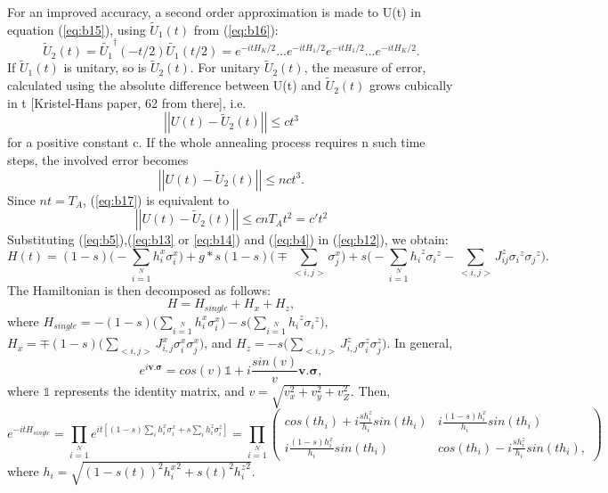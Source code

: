 \documentclass[12]{article}
\begin{document}
For an improved accuracy, a second order approximation is made to U(t) in equation (\ref{eq:b15}), using $\tilde{U}_1(t)$ from (\ref{eq:b16}):
\begin{equation}
\tilde{U}_2(t)=\tilde{U_1}^{\dagger}(-t/2)\tilde{U_1}(t/2)=e^{-itH_K/2}...e^{-itH_1/2}e^{-itH_1/2}...e^{-itH_K/2}.
\end{equation}
If $\tilde{U}_1(t)$ is unitary, so is $\tilde{U}_2(t)$. For unitary $\tilde{U}_2(t)$, the measure of error, calculated using the absolute difference between U(t) and $\tilde{U}_2(t)$ grows cubically in t [Kristel-Hans paper, 62 from there], i.e.
\begin{equation}
\left| \left| U(t)-\tilde{U}_2(t) \right| \right| \leq ct^3    
\end{equation} 
for a positive constant c. If the whole annealing process requires n such time steps, the involved error becomes
\begin{equation}
\left| \left| U(t)-\tilde{U}_2(t) \right| \right| \leq nct^3.  \label{eq:b17}
\end{equation}
Since $nt=T_A$, (\ref{eq:b17}) is equivalent to
\begin{equation}
\left| \left| U(t)-\tilde{U}_2(t) \right| \right| \leq cnT_At^2 = c't^2 \label{eq:b18}
\end{equation}
Substituting (\ref{eq:b5}),(\ref{eq:b13} or \ref{eq:b14}) and (\ref{eq:b4}) in (\ref{eq:b12}), we obtain:
\begin{equation}
H(t)=(1-s)\Big(-\sum \limits_{i=1}\limits^N h_i^x \sigma_i^x \Big)+g*s(1-s)\Big(\mp \sum \limits_{<i,j>}\sigma_{j}^x\Big) +s \Big(-\sum\limits_{i=1}\limits^{N}{h_i}^z{\sigma_i}^z - \sum\limits_{<i,j>}{J_{ij}^z} {\sigma_i}^z{\sigma_j}^z \Big).  \label{eq:b19}
\end{equation}
The Hamiltonian is then decomposed as follows:
\begin{equation}
H=H_{single}+H_x+H_z, \label{eq:b20}
\end{equation}
where $H_{single}=-(1-s)\Big(\sum \limits_{i=1}\limits^N h_i^x \sigma_i^x \Big)-s\Big(\sum\limits_{i=1}\limits^{N}{h_i}^z{\sigma_i}^z \Big)$, $H_x= \mp (1-s) \Big( \sum \limits_{<i,j>} J_{i,j}^x \sigma_{i}^x \sigma_{j}^x \Big)$, and $H_z= -s \Big(\sum \limits_{<i,j>} J_{i,j}^z \sigma_{i}^z\sigma_{j}^z\Big )$. In general, 
\begin{equation}
e^{i \mathbf{v.\sigma}}=cos(v) \mathbb{1} +i \frac{sin(v)}{v}\mathbf{v.\sigma},
\end{equation}
where $\mathbb{1}$ represents the identity matrix, and $v=\sqrt{v_x^2 +v_y^2 +v_Z^2}$. Then, 
\begin{equation}
e^{-itH_{single}}=\prod \limits_{i=1} \limits^{N} e^{it[(1-s)\sum \limits_i h_i^x \sigma_i^x +s \sum \limits_{i} h_i^z \sigma_i^z]} = \prod \limits_{i=1} \limits^{N} \begin{pmatrix}
cos(th_i) +i \frac{sh_i^z}{h_i} sin(th_i) &  i \frac{(1-s)h_i^x}{h_i} sin(th_i)\\
i \frac{(1-s)h_i^x}{h_i}sin(th_i) & cos(th_i) -i \frac{sh_i^z}{h_i} sin(th_i),
\end{pmatrix}
\end{equation}
where $h_i=\sqrt{(1-s(t))^2 {h_i^x}^2 + s(t)^2 {h_i^z}^2}$.\\
\end{document}
